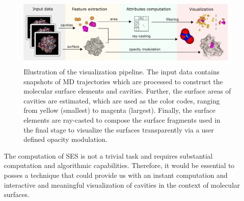 \begin{figure}[tb]
  \centering
  \includegraphics[width=\textwidth]{image/overview.pdf}
  \caption{Illustration of the visualization pipeline. The input data contains snapshots of MD trajectories which are processed to construct the molecular surface elements and cavities. Further, the surface areas of cavities are estimated, which are used as the color codes, ranging from yellow (smallest) to magenta (largest). Finally, the surface elements are ray-casted to compose the surface fragments used in the final stage to visualize the surfaces transparently via a user defined opacity modulation.}
	\label{fig:overview}
\end{figure}

The computation of SES is not a trivial task and requires substantial computation and algorithmic capabilities. 
Therefore, it would be essential to posses a technique that could provide us with an instant computation and interactive and meaningful visualization of cavities in the context of molecular surfaces.

